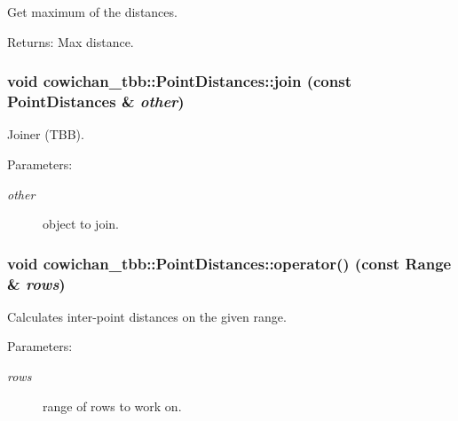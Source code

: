 Get maximum of the distances. \begin{Desc}
\item[Returns:]Max distance. \end{Desc}
\hypertarget{classcowichan__tbb_1_1_point_distances_db5e32d184099cae39b6a85e1670bea4}{
\subsubsection[{join}]{\setlength{\rightskip}{0pt plus 5cm}void cowichan\_\-tbb::PointDistances::join (const {\bf PointDistances} \& {\em other})}}
\label{classcowichan__tbb_1_1_point_distances_db5e32d184099cae39b6a85e1670bea4}


Joiner (TBB). \begin{Desc}
\item[Parameters:]
\begin{description}
\item[{\em other}]object to join. \end{description}
\end{Desc}
\hypertarget{classcowichan__tbb_1_1_point_distances_950a8a9aa03229cf8e00eb4ca941f1b2}{
\subsubsection[{operator()}]{\setlength{\rightskip}{0pt plus 5cm}void cowichan\_\-tbb::PointDistances::operator() (const {\bf Range} \& {\em rows})}}
\label{classcowichan__tbb_1_1_point_distances_950a8a9aa03229cf8e00eb4ca941f1b2}


Calculates inter-point distances on the given range. \begin{Desc}
\item[Parameters:]
\begin{description}
\item[{\em rows}]range of rows to work on. \end{description}
\end{Desc}


